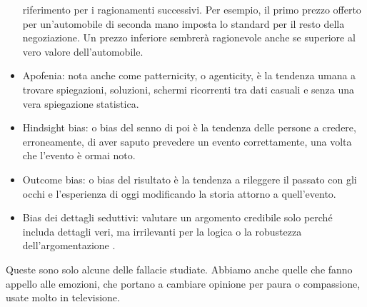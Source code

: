 \documentclass[12pt]{book} %
\begin{document}
\begin{itemize}
riferimento per i ragionamenti successivi. Per esempio, il primo prezzo offerto per un'automobile di seconda mano
imposta lo standard per il resto della negoziazione. Un prezzo inferiore sembrerà ragionevole anche se superiore al
vero valore dell'automobile.
\item Apofenia: nota anche come patternicity, o agenticity, è la tendenza umana a trovare spiegazioni, soluzioni,
schermi ricorrenti tra dati casuali e senza una vera spiegazione statistica.
\item Hindsight bias: o bias del senno di poi è la tendenza delle persone a credere, erroneamente, di aver saputo
prevedere un evento correttamente, una volta che l'evento è ormai noto. 
\item Outcome bias: o bias del risultato è la tendenza a rileggere il passato con gli occhi e
l'esperienza di oggi modificando la storia attorno a quell'evento.
\item Bias dei dettagli seduttivi: valutare un argomento credibile solo perché includa dettagli veri, ma irrilevanti per la logica o la robustezza dell’argomentazione
. 
\end{itemize}

Queste sono solo alcune delle fallacie studiate. Abbiamo anche quelle che fanno appello alle emozioni, che portano a
cambiare opinione per paura o compassione, usate molto in televisione.
\end{document}
